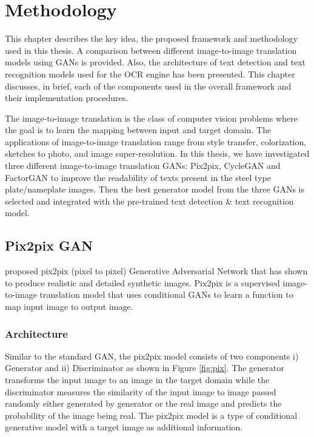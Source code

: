 \chapter{Methodology}\label{ch:method}
This chapter describes the key idea, the proposed framework and methodology used in this thesis. A comparison between different image-to-image translation models using GANs is provided. Also, the architecture of text detection and text recognition models used for the OCR engine has been presented. This chapter discusses, in brief, each of the components used in the overall framework and their implementation procedures.
\newline

        The image-to-image translation is the class of computer vision problems where the goal is to learn the mapping between input and target domain. The applications of image-to-image translation range from style transfer, colorization, sketches to photo, and image super-resolution. In this thesis, we have investigated three different image-to-image translation GANs: Pix2pix, CycleGAN and FactorGAN to improve the readability of texts present in the steel type plate/nameplate images. Then the best generator model from the three GANs is selected and integrated with the pre-trained text detection \& text recognition model.

\section{Pix2pix GAN}
	\cite{isola2017image} proposed pix2pix (pixel to pixel) Generative Adversarial Network that has shown to produce realistic and detailed synthetic images. Pix2pix is a supervised image-to-image translation model that uses conditional GANs to learn a function to map input image to output image.  

\subsection{Architecture}
Similar to the standard GAN, the pix2pix model consists of two components i) Generator and ii) Discriminator as shown in Figure \ref{fig:pix}. The generator transforms the input image to an image in the target domain while the discriminator measures the similarity of the input image to image passed randomly either generated by generator or the real image and predicts the probability of the image being real. The pix2pix model is a type of conditional generative model with a target image as additional information. 

